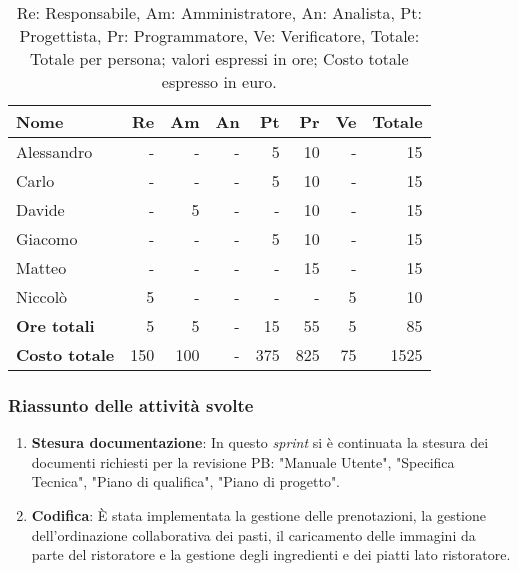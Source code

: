 \begin{table}[H]
	\centering
	\begin{tabular}{l|r|r|r|r|r|r|r}
		\textbf{Nome}         & \textbf{Re} & \textbf{Am} & \textbf{An} & \textbf{Pt} & \textbf{Pr} & \textbf{Ve} & \textbf{Totale} \\
		\hline
		Alessandro            & -           & -           & -           & 5           & 10          & -           & 15              \\
		Carlo                 & -           & -           & -           & 5           & 10          & -           & 15              \\
		Davide                & -           & 5           & -           & -           & 10          & -           & 15              \\
		Giacomo               & -           & -           & -           & 5           & 10          & -           & 15              \\
		Matteo                & -           & -           & -           & -           & 15          & -           & 15              \\
		Niccolò               & 5           & -           & -           & -           & -           & 5           & 10              \\
		\hline
		\textbf{Ore totali}   & 5           & 5           & -           & 15          & 55          & 5           & 85              \\
		\textbf{Costo totale} & 150         & 100         & -           & 375         & 825         & 75          & 1525
	\end{tabular}
	\caption{Re: Responsabile, Am: Amministratore, An: Analista, Pt: Progettista,
		Pr: Programmatore, Ve: Verificatore, Totale: Totale per persona; valori espressi in ore; Costo totale espresso in euro.}
\end{table}

\subsubsection{Riassunto delle attività svolte}

\begin{enumerate}
	\item \textbf{Stesura documentazione}: In questo \textit{sprint} si è continuata la stesura dei documenti richiesti per la revisione PB: "Manuale Utente", "Specifica Tecnica", "Piano di qualifica", "Piano di progetto".

	\item \textbf{Codifica}: È stata implementata la gestione delle prenotazioni, la gestione dell'ordinazione collaborativa dei pasti, il caricamento delle immagini da parte del ristoratore e la gestione degli ingredienti e dei piatti lato ristoratore.
\end{enumerate}

